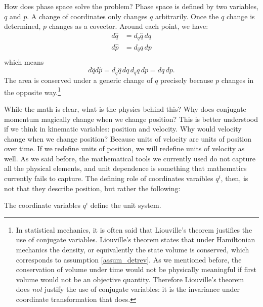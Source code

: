 How does phase space solve the problem? Phase space is defined by two variables, $q$ and $p$. A change of coordinates only changes $q$ arbitrarily. Once the $q$ change is determined, $p$ changes as a covector. Around each point, we have:
\begin{equation}
	\begin{aligned}
		d \hat{q} &= d_q \hat{q} \, dq \\
		d \hat{p} &= d_{\hat{q}} q \, dp \\
	\end{aligned}
\end{equation}
which means
\begin{equation}
	d \hat{q} d \hat{p} = d_q \hat{q} \, dq \, d_{\hat{q}} q \, dp = dq \, dp.
\end{equation}
The area is conserved under a generic change of $q$ precisely because $p$ changes in the opposite way.\footnote{In statistical mechanics, it is often said that Liouville's theorem justifies the use of conjugate variables. Liouville's theorem states that under Hamiltonian mechanics the density, or equivalently the state volume is conserved, which corresponds to assumption \ref{assum_detrev}. As we mentioned before, the conservation of volume under time would not be physically meaningful if first volume would not be an objective quantity. Therefore Liouville's theorem does \emph{not} justify the use of conjugate variables: it is the invariance under coordinate transformation that does. }

While the math is clear, what is the physics behind this? Why does conjugate momentum magically change when we change position? This is better understood if we think in kinematic variables: position and velocity. Why would velocity change when we change position? Because units of velocity are units of position over time. If we redefine units of position, we will redefine units of velocity as well. As we said before, the mathematical tools we currently used do not capture all the physical elements, and unit dependence is something that mathematics currently fails to capture. The defining role of coordinates varaibles $q^i$, then, is not that they describe position, but rather the following:
\begin{insight}
	The coordinate variables $q^i$ define the unit system.
\end{insight}

